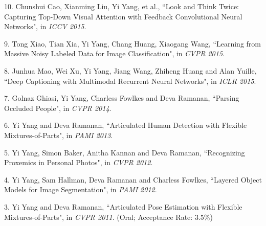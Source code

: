 \documentclass[margin]{res3}
\newenvironment{list1}{
  \begin{list}{\ding{113}}{%
      \setlength{\itemsep}{0.03in}
      \setlength{\parsep}{0in} \setlength{\parskip}{0in}
      \setlength{\topsep}{0in} \setlength{\partopsep}{0in}
      \setlength{\leftmargin}{0in}}}{\end{list}}
\begin{document}
\begin{resume}
\begin{list1}
\item[] 10. Chunshui Cao, Xianming Liu, Yi Yang, et al.,
``Look and Think Twice: Capturing Top-Down Visual Attention with Feedback Convolutional Neural Networks",
in \textit{ICCV 2015}. 

\item[] 9. Tong Xiao, Tian Xia, Yi Yang, Chang Huang, Xiaogang Wang,
``Learning from Massive Noisy Labeled Data for Image Classification",
in \textit{CVPR 2015}.

\item[] 8. Junhua Mao, Wei Xu, Yi Yang, Jiang Wang, Zhiheng Huang and Alan Yuille,
``Deep Captioning with Multimodal Recurrent Neural Networks",
in \textit{ICLR 2015}.

\item[] 7. Golnaz Ghiasi, Yi Yang, Charless Fowlkes and Deva Ramanan, 
``Parsing Occluded People", 
in \textit{CVPR 2014}.

\item[] 6. Yi Yang and Deva Ramanan, 
``Articulated Human Detection with Flexible Mixtures-of-Parts", 
in \textit{PAMI 2013}.

\item[] 5. Yi Yang, Simon Baker, Anitha Kannan and Deva Ramanan, 
``Recognizing Proxemics in Personal Photos", 
in \textit{CVPR 2012}.

\item[] 4. Yi Yang, Sam Hallman, Deva Ramanan and Charless Fowlkes, 
``Layered Object Models for Image Segmentation", 
in \textit{PAMI 2012}.

\item[] 3. Yi Yang and Deva Ramanan, 
``Articulated Pose Estimation with Flexible Mixtures-of-Parts", 
in \textit{CVPR 2011}. (Oral; Acceptance Rate: 3.5\%)


\end{list1}
\end{resume}
\end{document}
